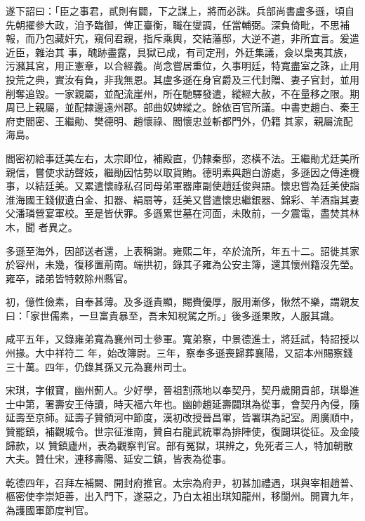 \begin{pinyinscope}
 遂下詔曰：「臣之事君，貳則有闢，下之謀上，將而必誅。兵部尚書盧多遜，頃自先朝擢參大政，洎予臨御，俾正臺衡，職在燮調，任當輔弼。深負倚毗，不思補報，而乃包藏奸宄，窺伺君親，指斥乘輿，交結藩邸，大逆不道，非所宜言。爰遣近臣，雜治其
 事，醜跡盡露，具獄已成，有司定刑，外廷集議，僉以梟夷其族，污瀦其宮，用正憲章，以合經義。尚念嘗居重位，久事明廷，特寬盡室之誅，止用投荒之典，實汝有負，非我無恩。其盧多遜在身官爵及三代封贈、妻子官封，並用削奪追毀。一家親屬，並配流崖州，所在馳驛發遣，縱經大赦，不在量移之限。期周已上親屬，並配隸邊遠州郡。部曲奴婢縱之。餘依百官所議。中書吏趙白、秦王府吏閻密、王繼勛、樊德明、趙懷祿、閻懷忠並斬都門外，仍籍
 其家，親屬流配海島。



 閻密初給事廷美左右，太宗即位，補殿直，仍隸秦邸，恣橫不法。王繼勛尤廷美所親信，嘗使求訪聲妓，繼勛因怙勢以取貨賄。德明素與趙白游處，多遜因之傳達機事，以結廷美。又累遣懷祿私召同母弟軍器庫副使趙廷俊與語。懷忠嘗為廷美使詣淮海國王錢俶遺白金、扣器、絹扇等，廷美又嘗遣懷忠繼銀器、錦彩、羊酒詣其妻父潘璘營宴軍校。至是皆伏罪。多遜累世墓在河面，未敗前，一夕震電，盡焚其林木，聞
 者異之。



 多遜至海外，因部送者還，上表稱謝。雍熙二年，卒於流所，年五十二。詔徙其家於容州，未幾，復移置荊南。端拱初，錄其子雍為公安主簿，還其懷州籍沒先塋。雍卒，諸弟皆特敕除州縣官。



 初，億性儉素，自奉甚薄。及多遜貴顯，賜賚優厚，服用漸侈，愀然不樂，謂親友曰：「家世儒素，一旦富貴暴至，吾未知稅駕之所。」後多遜果敗，人服其識。



 咸平五年，又錄雍弟寬為襄州司士參軍。寬弟察，中景德進士，將廷試，特詔授以州掾。大中祥符二
 年，始改簿尉。三年，察奉多遜喪歸葬襄陽，又詔本州賜察錢三十萬。四年，仍錄其孫又元為襄州司士。



 宋琪，字俶寶，幽州薊人。少好學，晉祖割燕地以奉契丹，契丹歲開貢部，琪舉進士中第，署壽安王侍讀，時天福六年也。幽帥趙延壽闢琪為從事，會契丹內侵，隨延壽至京師。延壽子贊領河中節度，漢初改授晉昌軍，皆署琪為記室。周廣順中，贊罷鎮，補觀城令。世宗征淮南，贊自右龍武統軍為排陣使，復闢琪從征。及金陵歸款，以
 贊鎮廬州，表為觀察判官。部有冤獄，琪辨之，免死者三人，特加朝散大夫。贊仕宋，連移壽陽、延安二鎮，皆表為從事。



 乾德四年，召拜左補闕、開封府推官。太宗為府尹，初甚加禮遇，琪與宰相趙普、樞密使李崇矩善，出入門下，遂惡之，乃白太祖出琪知龍州，移閬州。開寶九年，為護國軍節度判官。




\end{pinyinscope}
